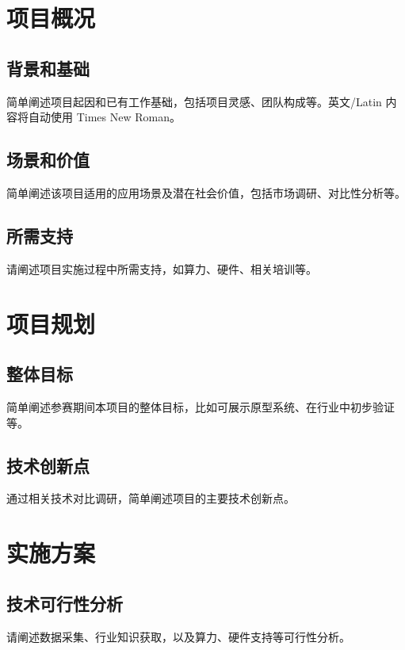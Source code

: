 \documentclass{cpipc}
\begin{document}
\maketitlepage

\makemycontents

\changehistory

\startmain

{\SectionHeading\section{项目概况}}

{\SubsectionHeading\subsection{背景和基础}}
{\BodyText
简单阐述项目起因和已有工作基础，包括项目灵感、团队构成等。英文/Latin 内容将自动使用 Times New Roman。
}

{\SubsectionHeading\subsection{场景和价值}}
{\BodyText
简单阐述该项目适用的应用场景及潜在社会价值，包括市场调研、对比性分析等。
}

{\SubsectionHeading\subsection{所需支持}}
{\BodyText
请阐述项目实施过程中所需支持，如算力、硬件、相关培训等。
}

{\SectionHeading\section{项目规划}}
{\SubsectionHeading\subsection{整体目标}}
{\BodyText
简单阐述参赛期间本项目的整体目标，比如可展示原型系统、在行业中初步验证等。
}

{\SubsectionHeading\subsection{技术创新点}}
{\BodyText
通过相关技术对比调研，简单阐述项目的主要技术创新点。
}

{\SectionHeading\section{实施方案}}
{\SubsectionHeading\subsection{技术可行性分析}}
{\BodyText
请阐述数据采集、行业知识获取，以及算力、硬件支持等可行性分析。
}
\end{document}
